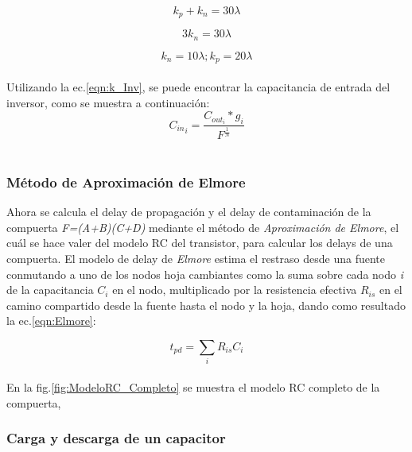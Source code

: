 \documentclass[12pt,a4paper]{article} %
\begin{document}
\begin{equation}\label{eqn:k1}
k_p + k_n = 30\lambda
\end{equation}

\begin{equation}\label{eqn:k2}
3k_n = 30\lambda
\end{equation}

\begin{equation}\label{eqn:k3}
k_n = 10\lambda ; k_p = 20\lambda
\end{equation}\\

Utilizando la ec.\ref{eqn:k_Inv}, se puede encontrar la capacitancia de entrada del inversor, como se muestra a continuación:\\

\begin{equation}\label{eqn:k_Inv}
{C_{in}}_{i}= \frac{C_{out}_{i}*g_{i}}{F^{\frac{1}{N}}}
\end{equation}\\


\subsubsection{Método de Aproximación de Elmore}

Ahora se calcula el delay de propagación y el delay de contaminación de la compuerta \textit{F=(A+B)(C+D)} mediante el método de \textit{Aproximación de Elmore}, el cuál se hace valer del modelo RC del transistor, para calcular los delays de una compuerta. El modelo de delay de \textit{Elmore} estima el restraso desde una fuente conmutando a uno de los nodos hoja cambiantes como la suma sobre cada nodo \textit{i} de la capacitancia \textit{$C_{i}$} en el nodo, multiplicado por la resistencia efectiva \textit{$R_{is}$} en el camino compartido desde la fuente hasta el nodo y la hoja, dando como resultado la ec.\ref{eqn:Elmore}:

\begin{equation}\label{eqn:Elmore}
t_{pd} = \sum_{i} R_{is}C_{i}
\end{equation}\\


En la fig.\ref{fig:ModeloRC_Completo} se muestra el modelo RC completo de la compuerta,
\subsubsection{Carga y descarga de un capacitor}
\end{document}
